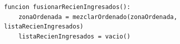 \begin{lstlisting}[style=pseudocodigo]
funcion fusionarRecienIngresados():
    zonaOrdenada = mezclarOrdenado(zonaOrdenada, listaRecienIngresados)
    listaRecienIngresados = vacio()
\end{lstlisting}

